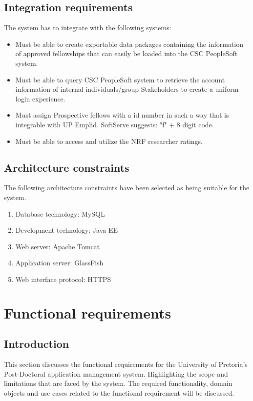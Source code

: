 \documentclass[12pt]{article}
\begin{document}
\subsection{Integration requirements} %
\vspace{0.2in}
The system has to integrate with the following systems:
\begin{itemize}
\item Must be able to create exportable data packages containing the information of approved fellowships that can easily be loaded into the CSC PeopleSoft system.
\item Must be able to query CSC PeopleSoft system to retrieve the account information of internal individuals/group Stakeholders to create a uniform login experience.
\item Must assign Prospective fellows with a id number in such a way that is integrable with UP Emplid. SoftServe suggests: "f" + 8 digit code.
\item Must be able to access and utilize the NRF researcher ratings.
\end{itemize}
\vspace{0.2in}

\subsection{Architecture constraints} %
\vspace{0.2in}
The following architecture constraints have been selected as being suitable for the system.
\begin{enumerate}
\item Database technology: MySQL
\item Development technology: Java EE
\item Web server: Apache Tomcat
\item Application server: GlassFish
\item Web interface protocol: HTTPS
\end{enumerate}
\vspace{0.5in}


\section{Functional requirements}
\subsection{Introduction} %
\vspace{0.2in}
This section discusses the functional requirements for the University of Pretoria's Post-Doctoral application management system. Highlighting the scope and limitations that are faced by the system. \linebreak \linebreak
The required functionality, domain objects and use cases related to the functional requirement will be discussed.
\vspace{0.2in}
\end{document}
